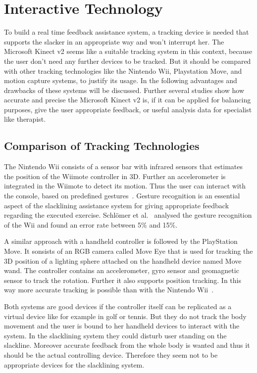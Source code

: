 \section{Interactive Technology}\label{2_3_interactiveTechnology}

To build a real time feedback assistance system, a tracking device is needed that supports the slacker in an appropriate way and won't interrupt her. The Microsoft Kinect v2 seems like a suitable tracking system in this context, because the user don't need any further devices to be tracked. But it should be compared with other tracking technologies like the Nintendo Wii, Playstation Move, and motion capture systems, to justify its usage. In the following advantages and drawbacks of these systems will be discussed. Further several studies show how accurate and precise the Microsoft Kinect v2 is, if it can be applied for balancing purposes, give the user appropriate feedback, or useful analysis data for specialist like therapist.

\subsection{Comparison of Tracking Technologies} \label{trackingTechnologie}

The Nintendo Wii consists of a sensor bar with infrared sensors that estimates the position of the Wiimote controller in 3D. Further an accelerometer is integrated in the Wiimote to detect its motion. Thus the user can interact with the console, based on predefined gestures~\cite{Bogdanovych2015-ci, Tanaka2012-ACO}. Gesture recognition is an essential aspect of the slacklining assistance system for giving appropriate feedback regarding the executed exercise. Schlömer et al.~\cite{Schlomer2008-uo} analysed the gesture recognition of the Wii and found an error rate between 5\% and 15\%.

A similar approach with a handheld controller is followed by the PlayStation Move. It sonsists of an RGB camera called Move Eye that is used for tracking the 3D position of a lighting sphere attached on the handheld device named Move wand. The controller contains an accelerometer, gyro sensor and geomagnetic sensor to track the rotation. Further it  also supports position tracking. In this way more accurate tracking is possible than with the Nintendo Wii~\cite{Bogdanovych2015-ci, Tanaka2012-ACO}.

Both systems are good devices if the controller itself can be replicated as a virtual device like for example in golf or tennis. But they do not track the body movement and the user is bound to her handheld devices to interact with the system. In the slacklining system they could disturb user standing on the slackline. Moreover accurate feedback from the whole body is wanted and thus it should be the actual controlling device. Therefore they seem not to be appropriate devices for the slacklining system.

